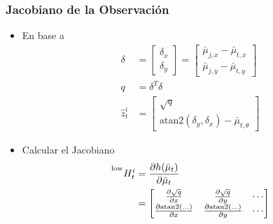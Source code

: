 \begin{frame}
    \frametitle{Jacobiano de la Observación}

    \begin{itemize}
        \item En base a
        \begin{align*}
            \delta &= 
            \begin{bmatrix}
                \delta_x \\
                \delta_y
            \end{bmatrix}
            = \begin{bmatrix}
                \bar{\mu}_{j,x} - \bar{\mu}_{t,x} \\
                \bar{\mu}_{j,y} - \bar{\mu}_{t,y}
            \end{bmatrix}\\
            q &= \delta^T \delta\\
            \hat{z}^i_t &= 
            \begin{bmatrix}
                \sqrt{q} \\
                \text{atan2}(\delta_y, \delta_x) - \bar{\mu}_{t,\theta}
            \end{bmatrix}
        \end{align*}    
        \item Calcular el Jacobiano
        \begin{align*}
            \prescript{\text{low}}{}{H^{i}_{t}} &= \frac{\partial h(\bar{\mu}_t)}{\partial \bar{\mu}_t}\\
            &= \begin{bmatrix}
                \frac{\partial \sqrt{q}}{\partial x} & \frac{\partial \sqrt{q}}{\partial y} & \cdots \\
                \frac{\partial \text{atan2}(\ldots)}{\partial x} & \frac{\partial \text{atan2}(\ldots)}{\partial y} & \cdots
            \end{bmatrix}
    \end{align*} 
    \end{itemize}

\end{frame}

